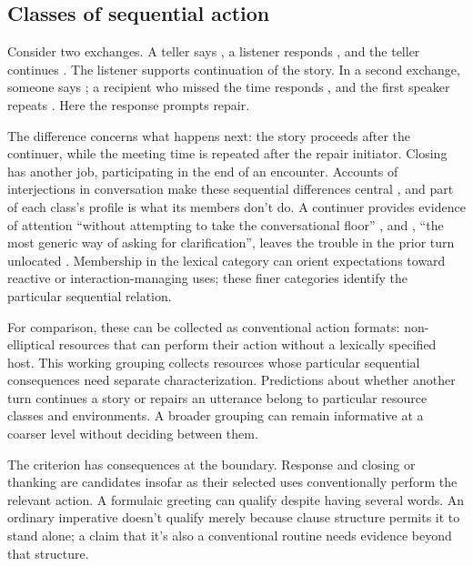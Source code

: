 \documentclass[12pt]{article}
\begin{document}
\subsection{Classes of sequential action}

Consider two exchanges. A teller says , a listener responds , and the teller continues
. The listener supports continuation of the
story. In a second exchange, someone says ;
a recipient who missed the time responds , and the first
speaker repeats . Here the response prompts repair.

The difference concerns what happens next: the story proceeds after
the continuer, while the meeting time is repeated after the repair
initiator. Closing  has another job, participating in the
end of an encounter. Accounts of interjections in conversation make
these sequential differences central \citep[257--259, 263--265]{dingemanse2024},
and part of each class's profile is what its members don't do. A continuer
provides evidence of attention \enquote{without attempting to take the
conversational floor} \citep[266]{dingemanse2024}, and ,
\enquote{the most generic way of asking for clarification}, leaves the
trouble in the prior turn unlocated \citep[267]{dingemanse2024}.
Membership in the lexical category can orient expectations toward reactive
or interaction-managing uses; these finer categories identify the particular
sequential relation.

For comparison, these can be collected as conventional action formats:
non-elliptical resources that can perform their action without a lexically
specified host. This working grouping collects resources whose particular sequential
consequences need separate characterization. Predictions about whether
another turn continues a story or repairs an utterance belong to
particular resource classes and environments. A broader grouping can
remain informative at a coarser level without deciding between them.

The criterion has consequences at the boundary. Response 
and closing or thanking  are candidates insofar as their
selected uses conventionally perform the relevant action. A formulaic
greeting  can qualify despite having several words.
An ordinary imperative  doesn't qualify merely because
clause structure permits it to stand alone; a claim that it's also a
conventional routine needs evidence beyond that structure.
\end{document}
